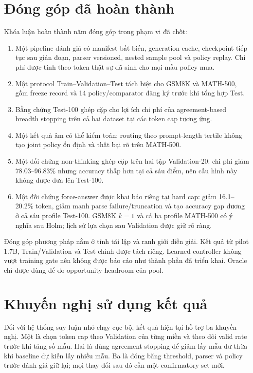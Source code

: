 \section{Đóng góp đã hoàn thành}

Khóa luận hoàn thành năm đóng góp trong phạm vi đã chốt:

\begin{enumerate}
  \item Một pipeline đánh giá có manifest bất biến, generation cache,
  checkpoint tiếp tục sau gián đoạn, parser versioned, nested sample pool và
  policy replay. Chi phí được tính theo token thật sự đã sinh cho mọi mẫu policy
  mua.
  \item Một protocol Train--Validation--Test tách biệt cho GSM8K và MATH-500,
  gồm freeze record và 14 policy/comparator đăng ký trước khi tổng hợp Test.
  \item Bằng chứng Test-100 ghép cặp cho lợi ích chi phí của agreement-based
  breadth stopping trên cả hai dataset tại các token cap tương ứng.
  \item Một kết quả âm có thể kiểm toán: routing theo prompt-length tertile
  không tạo joint policy ổn định và thất bại rõ trên MATH-500.
  \item Một đối chứng non-thinking ghép cặp trên hai tập Validation-20: chi phí
  giảm 78.03--96.83\% nhưng accuracy thấp hơn tại cả sáu điểm, nên cấu hình này
  không được đưa lên Test-100.
  \item Một đối chứng force-answer được khai báo riêng tại hard cap: giảm
  16.1--20.2\% token, giảm mạnh parse failure/truncation và tạo accuracy gap
  dương ở cả sáu profile Test-100. GSM8K $k=1$ và cả ba profile MATH-500 có ý
  nghĩa sau Holm; lịch sử lựa chọn sau Validation được giữ rõ ràng.
\end{enumerate}

Đóng góp phương pháp nằm ở tính tái lập và ranh giới diễn giải. Kết quả từ
pilot 1.7B, Train/Validation và Test chính được tách riêng. Learned controller
không vượt training gate nên không được báo cáo như thành phần đã triển khai.
Oracle chỉ được dùng để đo opportunity headroom của pool.

\section{Khuyến nghị sử dụng kết quả}

Đối với hệ thống suy luận nhỏ chạy cục bộ, kết quả hiện tại hỗ trợ ba khuyến
nghị. Một là chọn token cap theo Validation của từng miền và theo dõi valid rate
trước khi tăng số mẫu. Hai là dùng agreement stopping để giảm lấy mẫu dư thừa
khi baseline dự kiến lấy nhiều mẫu. Ba là đóng băng threshold, parser và policy
trước đánh giá giữ lại; mọi thay đổi sau đó cần một confirmatory set mới.

